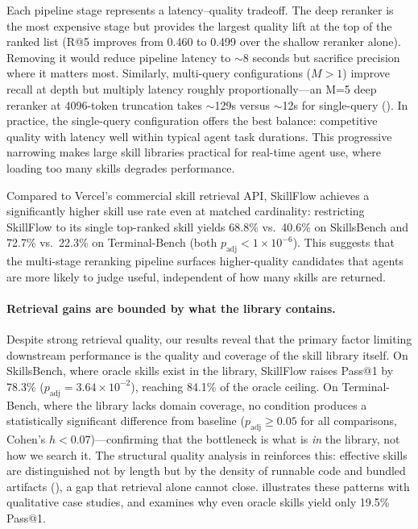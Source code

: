 \documentclass[11pt]{article}
\begin{document}
Each pipeline stage represents a latency--quality tradeoff.
The deep reranker is the most expensive stage but provides the largest quality lift at the top of the ranked list (R@5 improves from 0.460 to 0.499 over the shallow reranker alone). Removing it would reduce pipeline latency to ${\sim}$8 seconds but sacrifice precision where it matters most.
Similarly, multi-query configurations ($M > 1$) improve recall at depth but multiply latency roughly proportionally---an M=5 deep reranker at 4096-token truncation takes ${\sim}$129s versus ${\sim}$12s for single-query ().
In practice, the single-query configuration offers the best balance: competitive quality with latency well within typical agent task durations.
This progressive narrowing makes large skill libraries practical for real-time agent use, where loading too many skills degrades performance.

Compared to Vercel's commercial skill retrieval API, SkillFlow achieves a significantly higher skill use rate even at matched cardinality: restricting SkillFlow to its single top-ranked skill yields 68.8\% vs.\ 40.6\% on SkillsBench and 72.7\% vs.\ 22.3\% on Terminal-Bench (both $p_{\text{adj}} < 1 \times 10^{-6}$).
This suggests that the multi-stage reranking pipeline surfaces higher-quality candidates that agents are more likely to judge useful, independent of how many skills are returned.

\begin{table}[t]
  \centering
  \caption{Per-stage wall-clock latency.
  Latency in seconds, measured on 87 SkillsBench tasks with an Nvidia RTX A5000 GPU.
  Stage 1 includes query generation (5 queries via GPT-4o-mini) and FAISS search over 36K skills.
  Stages 2--3 include cross-encoder scoring.
  Stage 4 calls GPT-4o-mini for binary relevance filtering.}
  \label{tab:latency}
  
\end{table}

\paragraph{Retrieval gains are bounded by what the library contains.}
Despite strong retrieval quality, our results reveal that the primary factor limiting downstream performance is the quality and coverage of the skill library itself.
On SkillsBench, where oracle skills exist in the library, SkillFlow raises Pass@1 by 78.3\% ($p_{\text{adj}} = 3.64 \times 10^{-2}$), reaching 84.1\% of the oracle ceiling.
On Terminal-Bench, where the library lacks domain coverage, no condition produces a statistically significant difference from baseline ($p_{\text{adj}} \geq 0.05$ for all comparisons, Cohen's $h < 0.07$)---confirming that the bottleneck is what is \emph{in} the library, not how we search it.
The structural quality analysis in  reinforces this: effective skills are distinguished not by length but by the density of runnable code and bundled artifacts (), a gap that retrieval alone cannot close.
 illustrates these patterns with qualitative case studies, and  examines why even oracle skills yield only 19.5\% Pass@1.
\end{document}
